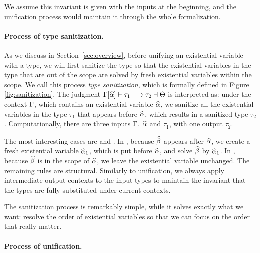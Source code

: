 We assume this invariant is given with the inputs at the beginning,
and the unification process would maintain it through the whole
formalization.

\paragraph{Process of type sanitization.}

As we discuss in Section~\ref{sec:overview}, before unifying an existential
variable with a type, we will first sanitize the type so that the existential
variables in the type that are out of the scope are solved by fresh existential
variables within the scope. We call this process \textit{type sanitization},
which is formally defined in Figure \ref{fig:sanitization}. The judgment
$\Gamma[\widehat{\alpha}] \vdash \tau_1 \longrightarrow \tau_2 \dashv \Theta$ is interpreted as: under the
context $\Gamma$, which contains an existential variable $\widehat{\alpha}$, we sanitize all
the existential variables in the type $\tau_1$ that appears before $\widehat{\alpha}$,
which results in a sanitized type $\tau_2$. Computationally, there are three
inputs $\Gamma$, $\widehat{\alpha}$ and $\tau_1$, with one output $\tau_2$.

The most interesting cases are  and . In
, because $\widehat{\beta}$ appears after $\widehat{\alpha}$, we create a fresh
existential variable $\widehat{\alpha}_1$, which is put before $\widehat{\alpha}$, and solve $\widehat{\beta}$
by $\widehat{\alpha}_1$. In , because $\widehat{\beta}$ is in the scope of $\widehat{\alpha}$,
we leave the existential variable unchanged.
The remaining rules are structural.
Similarly to unification, we always apply intermediate output
contexts to the input types to maintain the invariant that the types are fully
substituted under current contexts.

The sanitization process is remarkably simple, while it solves exactly what we
want: resolve the order of existential variables so that we can focus on the
order that really matter.

\paragraph{Process of unification.}

